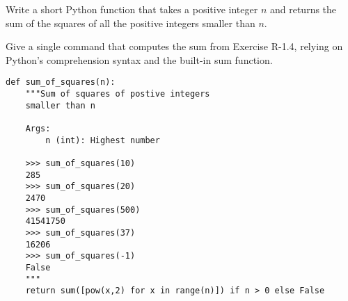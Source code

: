  \label{sssec:ex1_41_5}

Write a short Python function that takes a positive integer $n$ and returns the sum of the squares of all the positive integers smaller than $n$.

Give a single command that computes the sum from Exercise R-1.4, relying on Python's comprehension syntax and the built-in sum function.

\begin{lstlisting}[title=Exercise R-1.4 \& R-1.5]
def sum_of_squares(n):
    """Sum of squares of postive integers
    smaller than n

    Args:
        n (int): Highest number

    >>> sum_of_squares(10)
    285
    >>> sum_of_squares(20)
    2470
    >>> sum_of_squares(500)
    41541750
    >>> sum_of_squares(37)
    16206
    >>> sum_of_squares(-1)
    False
    """
    return sum([pow(x,2) for x in range(n)]) if n > 0 else False
\end{lstlisting}